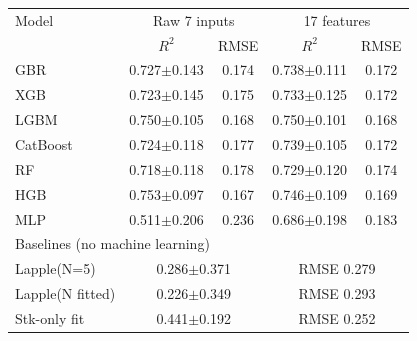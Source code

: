 \begin{tabular}{lcccc}\toprule Model & \multicolumn{2}{c}{Raw 7 inputs} & \multicolumn{2}{c}{17 features}\\ & $R^2$ & RMSE & $R^2$ & RMSE\\\midrule
GBR & 0.727$\pm$0.143 & 0.174 & 0.738$\pm$0.111 & 0.172\\
XGB & 0.723$\pm$0.145 & 0.175 & 0.733$\pm$0.125 & 0.172\\
LGBM & 0.750$\pm$0.105 & 0.168 & 0.750$\pm$0.101 & 0.168\\
CatBoost & 0.724$\pm$0.118 & 0.177 & 0.739$\pm$0.105 & 0.172\\
RF & 0.718$\pm$0.118 & 0.178 & 0.729$\pm$0.120 & 0.174\\
HGB & 0.753$\pm$0.097 & 0.167 & 0.746$\pm$0.109 & 0.169\\
MLP & 0.511$\pm$0.206 & 0.236 & 0.686$\pm$0.198 & 0.183\\
\midrule\multicolumn{5}{l}{Baselines (no machine learning)}\\
Lapple(N=5) & \multicolumn{2}{c}{0.286$\pm$0.371} & \multicolumn{2}{c}{RMSE 0.279}\\
Lapple(N fitted) & \multicolumn{2}{c}{0.226$\pm$0.349} & \multicolumn{2}{c}{RMSE 0.293}\\
Stk-only fit & \multicolumn{2}{c}{0.441$\pm$0.192} & \multicolumn{2}{c}{RMSE 0.252}\\
\bottomrule\end{tabular}